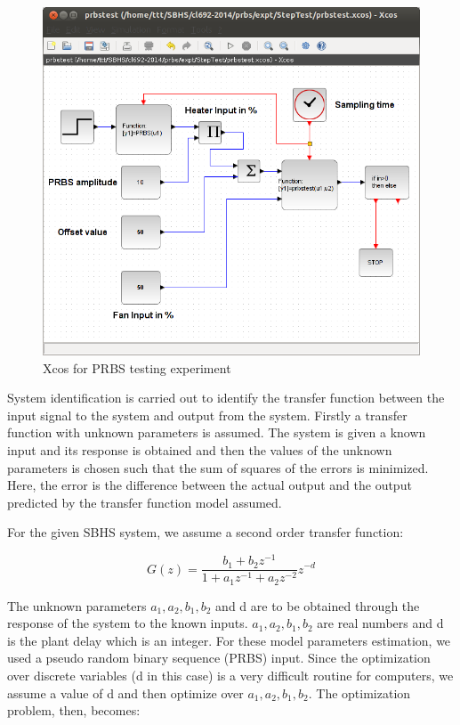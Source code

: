 \begin{figure}
\centering
\includegraphics[width=0.7\linewidth]{prbs/prbs-xcos.png}
\caption{Xcos for PRBS testing experiment}
\label{prbs-xcos}
\end{figure}


System identification is carried out to identify the transfer function between the input signal to the system and output from the system. Firstly a transfer function with unknown parameters is assumed. The system is given a known input and its response is obtained and then the values of the unknown parameters is chosen such that the sum of squares of the errors is minimized. Here, the error is the difference between the actual output and the output predicted by the transfer function model assumed.



For the given SBHS system, we assume a second order transfer function:

\begin{equation}
G(z)=\frac{b_{1}+b_{2}z^{-1}}{1+a_{1}z^{-1}+a_{2}z^{-2}}z^{-d}
\end{equation}


The unknown parameters $a_1, a_2, b_1, b_2$ and d are to be obtained through the response of the system to the known inputs.  $a_1, a_2, b_1, b_2$ are real numbers and d is the plant delay which is an integer.  For these model parameters estimation, we used a pseudo random binary sequence (PRBS) input. Since the optimization over discrete variables (d in this case) is a very difficult routine for computers, we assume a value of d and then optimize over  $a_1, a_2, b_1, b_2$. The optimization problem, then, becomes:



